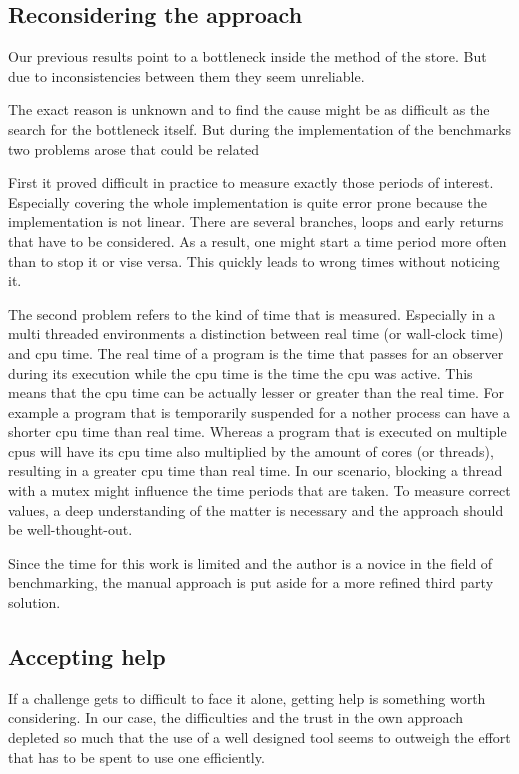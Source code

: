 \subsection{Reconsidering the approach}
Our previous results point to a bottleneck inside the  method of the store. But due to inconsistencies between them they seem unreliable.

The exact reason is unknown and to find the cause might be as difficult as the search for the bottleneck itself. But during the implementation of the benchmarks two problems arose that could be related

First it proved difficult in practice to measure exactly those periods of interest. Especially covering the whole implementation is quite error prone because the implementation is not linear. There are several branches, loops and early returns that have to be considered. As a result, one might start a time period more often than to stop it or vise versa. This quickly leads to wrong times without noticing it.

The second problem refers to the kind of time that is measured. Especially in a multi threaded environments a distinction between real time (or wall-clock time) and cpu time. The real time of a program is the time that passes for an observer during its execution while the cpu time is the time the cpu was active. This means that the cpu time can be actually lesser or greater than the real time. For example a program that is temporarily suspended for a nother process can have a shorter cpu time than real time. Whereas a program that is executed on multiple cpus will have its cpu time also multiplied by the amount of cores (or threads), resulting in a greater cpu time than real time. In our scenario, blocking a thread with a mutex might influence the time periods that are taken. To measure correct values, a deep understanding of the matter is necessary and the approach should be well-thought-out.

Since the time for this work is limited and the author is a novice in the field of benchmarking, the manual approach is put aside for a more refined third party solution.

\subsection{Accepting help}
If a challenge gets to difficult to face it alone, getting help is something worth considering. In our case, the difficulties and the trust in the own approach depleted so much that the use of a well designed tool seems to outweigh the effort that has to be spent to use one efficiently.

